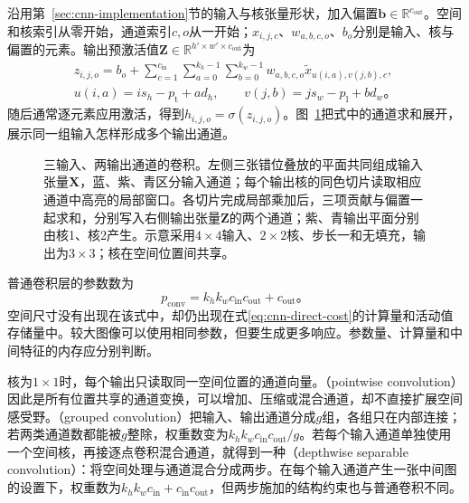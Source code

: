 沿用第~\ref{sec:cnn-implementation}节的输入与核张量形状，加入偏置$\bm b\in\mathbb R^{c_{\mathrm{out}}}$。空间和核索引从零开始，通道索引$c,o$从一开始；$x_{i,j,c}$、$w_{a,b,c,o}$、$b_o$分别是输入、核与偏置的元素。输出预激活值$\bm Z\in\mathbb R^{h'\times w'\times c_{\mathrm{out}}}$为
\begin{equation}
  \begin{aligned}
    z_{i,j,o}=b_o+\sum_{c=1}^{c_{\mathrm{in}}}
      \sum_{a=0}^{k_h-1}\sum_{b=0}^{k_w-1}
      w_{a,b,c,o}\widetilde x_{u(i,a),v(j,b),c},\\
    u(i,a)=is_h-p_{\mathrm t}+ad_h,\qquad
    v(j,b)=js_w-p_{\mathrm l}+bd_w\text{。}
  \end{aligned}
  \label{eq:cnn-layer-forward}
\end{equation}
随后通常逐元素应用激活，得到$h_{i,j,o}=\sigma(z_{i,j,o})$。图~\ref{fig:cnn-channels}把式中的通道求和展开，展示同一组输入怎样形成多个输出通道。

\begin{figure}[htb]
  \centering
  
  \caption{三输入、两输出通道的卷积。左侧三张错位叠放的平面共同组成输入张量$\bm X$，蓝、紫、青区分输入通道；每个输出核的同色切片读取相应通道中高亮的局部窗口。各切片完成局部乘加后，三项贡献与偏置一起求和，分别写入右侧输出张量$\bm Z$的两个通道；紫、青输出平面分别由核1、核2产生。示意采用$4\times4$输入、$2\times2$核、步长一和无填充，输出为$3\times3$；核在空间位置间共享。}
  \label{fig:cnn-channels}
\end{figure}

普通卷积层的参数数为
\begin{equation}
  p_{\mathrm{conv}}=k_hk_wc_{\mathrm{in}}c_{\mathrm{out}}
                    +c_{\mathrm{out}}\text{。}
  \label{eq:cnn-layer-parameters}
\end{equation}
空间尺寸没有出现在该式中，却仍出现在式\eqref{eq:cnn-direct-cost}的计算量和活动值存储量中。较大图像可以使用相同参数，但要生成更多响应。参数量、计算量和中间特征的内存应分别判断。

核为$1\times1$时，每个输出只读取同一空间位置的通道向量。（pointwise convolution）因此是所有位置共享的通道变换，可以增加、压缩或混合通道，却不直接扩展空间感受野。（grouped convolution）把输入、输出通道分成$g$组，各组只在内部连接；若两类通道数都能被$g$整除，权重数变为$k_hk_wc_{\mathrm{in}}c_{\mathrm{out}}/g$。若每个输入通道单独使用一个空间核，再接逐点卷积混合通道，就得到一种（depthwise separable convolution）：将空间处理与通道混合分成两步。在每个输入通道产生一张中间图的设置下，权重数为$k_hk_wc_{\mathrm{in}}+c_{\mathrm{in}}c_{\mathrm{out}}$，但两步施加的结构约束也与普通卷积不同。

